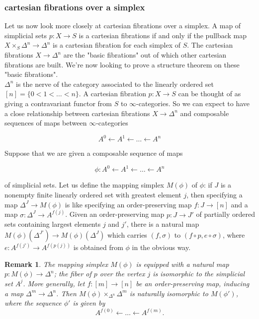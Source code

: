 \documentclass[12pt]{amsart}
\newcommand{\8}{\ensuremath{\infty}}
\newtheorem{remark}{Remark}
\begin{document}
\subsubsection{cartesian fibrations over a simplex}
Let us now look more closely at cartesian fibrations over a simplex. A map of simplicial sets $p:X\rightarrow S$ is a cartesian fibrations if and only if the pullback map $X\times_S \Delta^n \rightarrow \Delta^n$ is a cartesian fibration for each simplex of $S$. The cartesian fibrations $X\rightarrow \Delta^n$ are the "basic fibrations" out of which other cartesian fibrations are built. We're now looking to prove a structure theorem on these "basic fibrations".\\
$\Delta^n$ is the nerve of the category associated to the linearly ordered set $[n] = \{0<1<\dots <n\}.$ A cartesian fibration $p:X\rightarrow S$ can be thought of as giving a contravariant functor from $S$ to $\8$-categories. So we can expect to have a close relationship between cartesian fibrations $X\rightarrow \Delta^n$ and composable sequences of maps between \8-categories

$$
  A^0\leftarrow A^1\leftarrow \dots \leftarrow A^n
$$

Suppose that we are given a composable sequence of maps

$$
  \phi:A^0\leftarrow A^1\leftarrow \dots \leftarrow A^n
$$

of simplicial sets. Let us define the mapping simplex $M(\phi)$ of $\phi$: if $J$ is a nonempty finite linearly ordered set with greatest element $j$, then specifying a map $\Delta^J\rightarrow M(\phi)$ is like specifying an order-preserving map $f:J\rightarrow [n]$ and a map $\sigma:\Delta^J\rightarrow A^{f(j)}$. Given an order-preserving map $p:J\rightarrow J'$ of partially ordered sets containing largest elements $j$ and $j'$, there is a natural map $M(\phi)(\Delta^{J'})\rightarrow M(\phi)(\Delta^J)$ which carries $(f,\sigma)$ to $(f\circ p, e\circ\sigma)$, where $e:A^{f(j')}\rightarrow A^{f(p(j))}$ is obtained from $\phi$ in the obvious way.

\begin{remark}
  The mapping simplex $M(\phi)$ is equipped with a natural map $p:M(\phi)\rightarrow \Delta^n$; the fiber of $p$ over the vertex $j$ is isomorphic to the simplicial set $A^j$. More generally, let $f:[m]\rightarrow [n]$ be an order-preserving map, inducing a map $\Delta^m\rightarrow \Delta^n$. Then $M(\phi)\times_{\Delta^n}\Delta^m$ is naturally isomorphic to $M(\phi')$, where the sequence $\phi'$ is given by
  $$
    A^{f(0)}\leftarrow\dots\leftarrow A^{f(m)}.
  $$
\end{remark}
\end{document}
